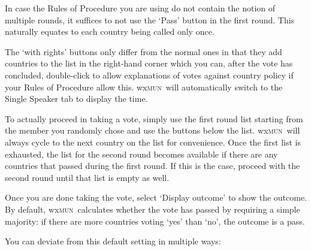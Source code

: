 \documentclass[11pt, a4paper]{article}
\newcommand\wxMUN{wx\textsc{mun}}
\begin{document}
In case the Rules of Procedure you are using do not contain the notion of multiple rounds, it suffices to not use the `Pass' button in the first round. This naturally equates to each country being called only once. 

The `with rights' buttons only differ from the normal ones in that they add countries to the list in the right-hand corner which you can, after the vote has concluded, double-click to allow explanations of votes against country policy if your Rules of Procedure allow this. \wxMUN\ will automatically switch to the Single Speaker tab to display the time.

To actually proceed in taking a vote, simply use the first round list starting from the member you randomly chose and use the buttons below the list. \wxMUN\ will always cycle to the next country on the list for convenience. Once the first list is exhausted, the list for the second round becomes available if there are any countries that passed during the first round. If this is the case, proceed with the second round until that list is empty as well.

Once you are done taking the vote, select `Display outcome' to show the outcome. By default, \wxMUN\ calculates whether the vote has passed by requiring a simple majority: if there are more countries voting `yes' than `no', the outcome is a pass.

You can deviate from this default setting in multiple ways:
\end{document}
